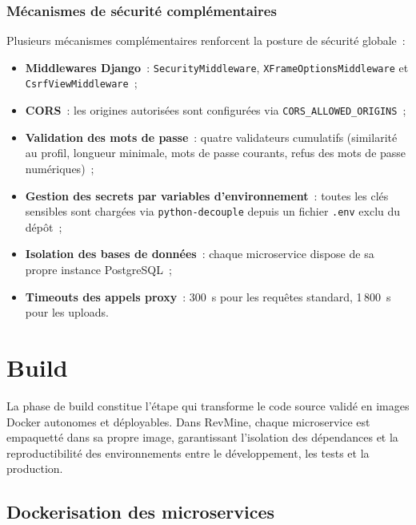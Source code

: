 \subsubsection{Mécanismes de sécurité complémentaires}

Plusieurs mécanismes complémentaires renforcent la posture de sécurité globale~:
\begin{itemize}
    \item \textbf{Middlewares Django}~: \texttt{SecurityMiddleware}, \texttt{XFrameOptionsMiddleware}
          et \texttt{CsrfViewMiddleware}~;
    \item \textbf{CORS}~: les origines autorisées sont configurées via
          \texttt{CORS\_ALLOWED\_ORIGINS}~;
    \item \textbf{Validation des mots de passe}~: quatre validateurs cumulatifs (similarité au
          profil, longueur minimale, mots de passe courants, refus des mots de passe numériques)~;
    \item \textbf{Gestion des secrets par variables d'environnement}~: toutes les clés sensibles
          sont chargées via \texttt{python-decouple} depuis un fichier \texttt{.env} exclu du
          dépôt~;
    \item \textbf{Isolation des bases de données}~: chaque microservice dispose de sa propre
          instance PostgreSQL~;
    \item \textbf{Timeouts des appels proxy}~: 300~s pour les requêtes standard, 1\,800~s pour
          les uploads.
\end{itemize}

\section{Build}
\label{sec:build}

La phase de build constitue l'étape qui transforme le code source validé en images Docker
autonomes et déployables. Dans RevMine, chaque microservice est empaquetté dans sa propre image,
garantissant l'isolation des dépendances et la reproductibilité des environnements entre le
développement, les tests et la production.

\subsection{Dockerisation des microservices}

